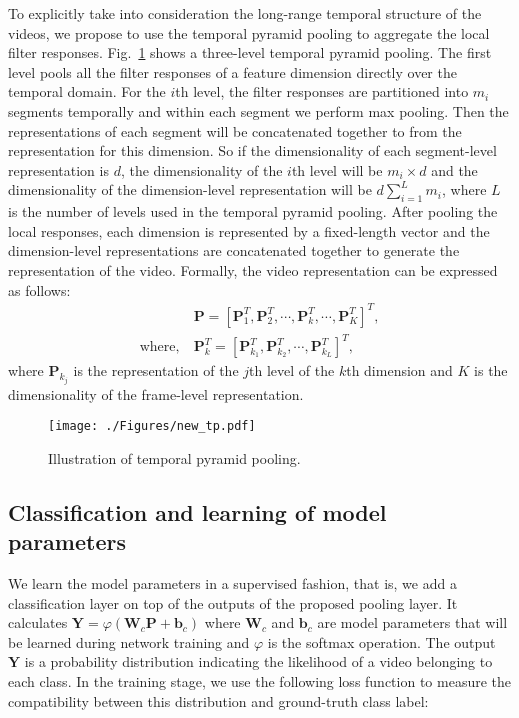 \documentclass[journal]{IEEEtran}
\begin{document}
To explicitly take into consideration the long-range temporal structure of the videos, we propose to use the temporal pyramid pooling to aggregate the local filter responses. Fig.~\ref{fig:tp} shows a three-level temporal pyramid pooling. The first level pools all the filter responses of a feature dimension directly over the temporal domain. For the $i$th level, the filter responses are partitioned into $m_i$ segments temporally and within each segment we perform max pooling. Then the representations of each segment will be concatenated together to from the representation for this dimension. So if the dimensionality of each segment-level representation is $d$, the dimensionality of the $i$th level will be $m_i\times d$ and the dimensionality of the dimension-level representation will be $d\sum_{i=1}^L m_i$, where $L$ is the number of levels used in the temporal pyramid pooling. After pooling the local responses, each dimension is represented by a fixed-length vector and the dimension-level representations are concatenated together to generate the representation of the video. Formally, the video representation can be expressed as follows:
\begin{equation}
\begin{aligned}
&\mathbf{P} = [\mathbf{P}^T_1, \mathbf{P}^T_2, \cdots, \mathbf{P}^T_k,\cdots, \mathbf{P}^T_K]^T,  \\
\text{where}, ~& \mathbf{P}^T_k = [\mathbf{P}^T_{k_{1}}, \mathbf{P}^T_{k_{2}}, \cdots, \mathbf{P}^T_{k_{L}}]^T,
\end{aligned}
\end{equation}
where $\mathbf{P}_{k_{j}}$ is the representation of the $j$th level of the $k$th dimension and $K$ is the dimensionality of the frame-level representation.



\begin{figure}[h]
\begin{center}
\captionsetup{justification=centering}
\texttt{[image: ./Figures/new\_tp.pdf]}
\end{center}
   \caption{Illustration of temporal pyramid pooling.}
\label{fig:tp}
\end{figure}





\subsection{Classification and learning of model parameters}
We learn the model parameters in a supervised fashion, that is, we add a classification layer on top of the outputs of the proposed pooling layer. It calculates $\mathbf{Y}=\varphi\left (\mathbf{W}_c\mathbf{P}+\mathbf{b}_c\right)$ where $\mathbf{W}_c$ and $\mathbf{b}_c$ are model parameters that will be learned during network training and $\varphi$ is the softmax \cite{MatCov} operation. The output $\mathbf{Y}$ is a probability distribution indicating the likelihood of a video belonging to each class. In the training stage, we use the following loss function to measure the compatibility between this distribution and ground-truth class label:
\end{document}
